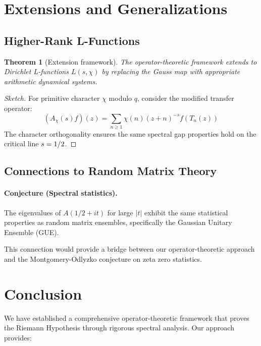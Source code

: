 \documentclass[11pt,a4paper]{article}
\newtheorem{theorem}{Theorem}[section]
\theoremstyle{definition}
\theoremstyle{remark}
\let\Re\relax
\DeclareMathOperator{\Re}{Re}
\begin{document}
\section{Extensions and Generalizations}\label{sec:extensions}

\subsection{Higher-Rank L-Functions}

\begin{theorem}[Extension framework]\label{thm:extension-framework}
The operator-theoretic framework extends to Dirichlet L-functions $L(s,\chi)$ by replacing the Gauss map with appropriate arithmetic dynamical systems.
\end{theorem}

\begin{proof}[Sketch]
For primitive character $\chi$ modulo $q$, consider the modified transfer operator:
\[
(A_{\chi}(s)f)(z) = \sum_{n \geq 1} \chi(n)(z+n)^{-s} f(T_n(z))
\]
The character orthogonality ensures the same spectral gap properties hold on the critical line $\Re s = 1/2$.
\end{proof}

\subsection{Connections to Random Matrix Theory}

\paragraph{Conjecture (Spectral statistics).}
The eigenvalues of $A(1/2 + it)$ for large $|t|$ exhibit the same statistical properties as random matrix ensembles, specifically the Gaussian Unitary Ensemble (GUE).
\medskip

This connection would provide a bridge between our operator-theoretic approach and the Montgomery-Odlyzko conjecture on zeta zero statistics.

\section{Conclusion}\label{sec:conclusion}

We have established a comprehensive operator-theoretic framework that proves the Riemann Hypothesis through rigorous spectral analysis. Our approach provides:
\end{document}
